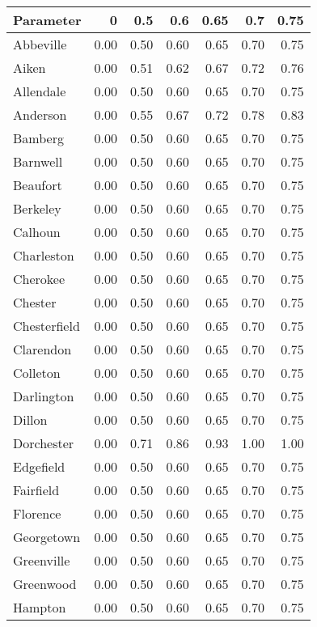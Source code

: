 \begin{tabular}{lrrrrrr}
\toprule
   Parameter &    0 &  0.5 &  0.6 &  0.65 &  0.7 &  0.75 \\
\midrule
   Abbeville & 0.00 & 0.50 & 0.60 &  0.65 & 0.70 &  0.75 \\
       Aiken & 0.00 & 0.51 & 0.62 &  0.67 & 0.72 &  0.76 \\
   Allendale & 0.00 & 0.50 & 0.60 &  0.65 & 0.70 &  0.75 \\
    Anderson & 0.00 & 0.55 & 0.67 &  0.72 & 0.78 &  0.83 \\
     Bamberg & 0.00 & 0.50 & 0.60 &  0.65 & 0.70 &  0.75 \\
    Barnwell & 0.00 & 0.50 & 0.60 &  0.65 & 0.70 &  0.75 \\
    Beaufort & 0.00 & 0.50 & 0.60 &  0.65 & 0.70 &  0.75 \\
    Berkeley & 0.00 & 0.50 & 0.60 &  0.65 & 0.70 &  0.75 \\
     Calhoun & 0.00 & 0.50 & 0.60 &  0.65 & 0.70 &  0.75 \\
  Charleston & 0.00 & 0.50 & 0.60 &  0.65 & 0.70 &  0.75 \\
    Cherokee & 0.00 & 0.50 & 0.60 &  0.65 & 0.70 &  0.75 \\
     Chester & 0.00 & 0.50 & 0.60 &  0.65 & 0.70 &  0.75 \\
Chesterfield & 0.00 & 0.50 & 0.60 &  0.65 & 0.70 &  0.75 \\
   Clarendon & 0.00 & 0.50 & 0.60 &  0.65 & 0.70 &  0.75 \\
    Colleton & 0.00 & 0.50 & 0.60 &  0.65 & 0.70 &  0.75 \\
  Darlington & 0.00 & 0.50 & 0.60 &  0.65 & 0.70 &  0.75 \\
      Dillon & 0.00 & 0.50 & 0.60 &  0.65 & 0.70 &  0.75 \\
  Dorchester & 0.00 & 0.71 & 0.86 &  0.93 & 1.00 &  1.00 \\
   Edgefield & 0.00 & 0.50 & 0.60 &  0.65 & 0.70 &  0.75 \\
   Fairfield & 0.00 & 0.50 & 0.60 &  0.65 & 0.70 &  0.75 \\
    Florence & 0.00 & 0.50 & 0.60 &  0.65 & 0.70 &  0.75 \\
  Georgetown & 0.00 & 0.50 & 0.60 &  0.65 & 0.70 &  0.75 \\
  Greenville & 0.00 & 0.50 & 0.60 &  0.65 & 0.70 &  0.75 \\
   Greenwood & 0.00 & 0.50 & 0.60 &  0.65 & 0.70 &  0.75 \\
     Hampton & 0.00 & 0.50 & 0.60 &  0.65 & 0.70 &  0.75 \\

\end{tabular}
